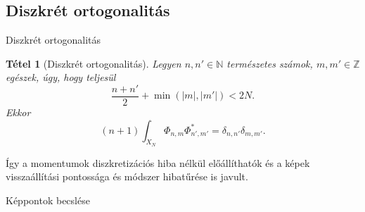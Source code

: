\documentclass{beamer}
\newcommand{\N}{\mathbb{N}}
\newcommand{\Z}{\mathbb{Z}}
\def\N{{\mathbb N}}
\def\Z{{\mathbb Z}}
\newtheorem{tetel}{Tétel}
\begin{document}
\subsection{Diszkrét ortogonalitás}
\begin{frame}{Diszkrét ortogonalitás}
\begin{tetel}[Diszkrét ortogonalitás]
    Legyen $n, n' \in \N$ természetes számok, $m, m' \in \Z$ egészek, úgy, hogy teljesül $$\frac{n + n'}{2} + \min(|m|,|m'|) < 2N.$$
    Ekkor $$(n + 1)\int_{X_N}\Phi_{n,m}\Phi_{n',m'}^* = \delta_{n,n'}\delta_{m,m'}.$$
\end{tetel}
Így a momentumok diszkretizációs hiba nélkül előállíthatók és a képek visszaállítási pontossága és módszer hibatűrése is javult.
\end{frame}

\begin{frame}{Képpontok becslése}


\end{frame}
\end{document}
